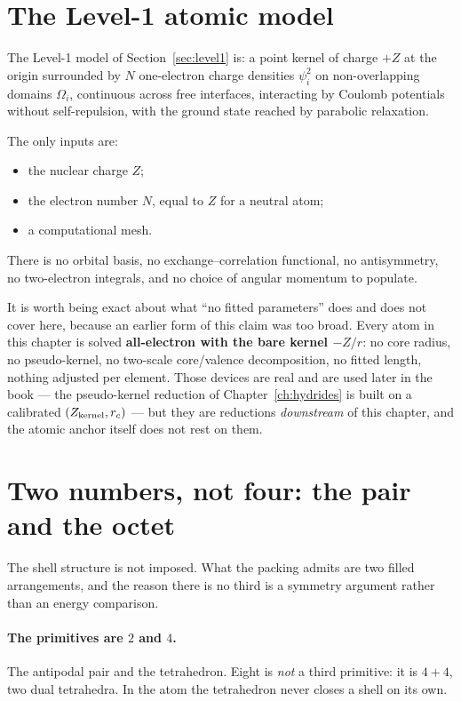 \section{The Level-1 atomic model}\label{sec:level1-model}

The Level-1 model of Section~\ref{sec:level1} is: a point kernel of charge $+Z$ at the origin
surrounded by $N$ one-electron charge densities $\psi_i^2$ on non-overlapping domains $\Omega_i$,
continuous across free interfaces, interacting by Coulomb potentials without self-repulsion, with
the ground state reached by parabolic relaxation.

The only inputs are:
\begin{itemize}
\item the nuclear charge $Z$;
\item the electron number $N$, equal to $Z$ for a neutral atom;
\item a computational mesh.
\end{itemize}
There is no orbital basis, no exchange--correlation functional, no antisymmetry, no two-electron
integrals, and no choice of angular momentum to populate.

It is worth being exact about what ``no fitted parameters'' does and does not cover here, because
an earlier form of this claim was too broad. Every atom in this chapter is solved
\textbf{all-electron with the bare kernel $-Z/r$}: no core radius, no pseudo-kernel, no
two-scale core/valence decomposition, no fitted length, nothing adjusted per element. Those
devices are real and are used later in the book --- the pseudo-kernel reduction of
Chapter~\ref{ch:hydrides} is built on a calibrated $(Z_{\rm kernel}, r_c)$ --- but they are
reductions \emph{downstream} of this chapter, and the atomic anchor itself does not rest on them.

\section{Two numbers, not four: the pair and the octet}\label{sec:twoeight}

The shell structure is not imposed. What the packing admits are two filled arrangements, and the
reason there is no third is a symmetry argument rather than an energy comparison.

\paragraph{The primitives are $2$ and $4$.}
The antipodal pair and the tetrahedron. Eight is \emph{not} a third primitive: it is $4{+}4$, two
dual tetrahedra. In the atom the tetrahedron never closes a shell on its own.


